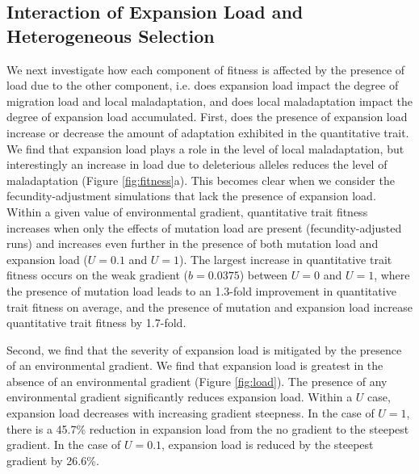\subsection{Interaction of Expansion Load and Heterogeneous Selection}
We next investigate how each component of fitness is affected by the presence of load due to the other component, i.e. does expansion load impact the degree of migration load and local maladaptation, and does local maladaptation impact the degree of expansion load accumulated. First, does the presence of expansion load increase or decrease the amount of adaptation exhibited in the quantitative trait. We find that expansion load plays a role in the level of local maladaptation, but interestingly an increase in load due to deleterious alleles reduces the level of maladaptation (Figure \ref{fig:fitness}a). This becomes clear when we consider the fecundity-adjustment simulations that lack the presence of expansion load. Within a given value of environmental gradient, quantitative trait fitness increases when only the effects of mutation load are present (fecundity-adjusted runs) and increases even further in the presence of both mutation load and expansion load ($U = 0.1$ and $U = 1$). 
The largest increase in quantitative trait fitness occurs on the weak gradient ($b = 0.0375$) between $U = 0$ and $U = 1$, where the presence of mutation load leads to an 1.3-fold improvement in quantitative trait fitness on average, and the presence of mutation and expansion load increase quantitative trait fitness by 1.7-fold. %

Second, we find that the severity of expansion load is mitigated by the presence of an environmental gradient. We find that expansion load is greatest in the absence of an environmental gradient (Figure \ref{fig:load}). The presence of any environmental gradient significantly reduces expansion load. Within a $U$ case, expansion load decreases with increasing gradient steepness. In the case of $U = 1$, there is a 45.7\% reduction in expansion load from the no gradient to the steepest gradient. In the case of $U = 0.1$, expansion load is reduced by the steepest gradient by 26.6\%. 



